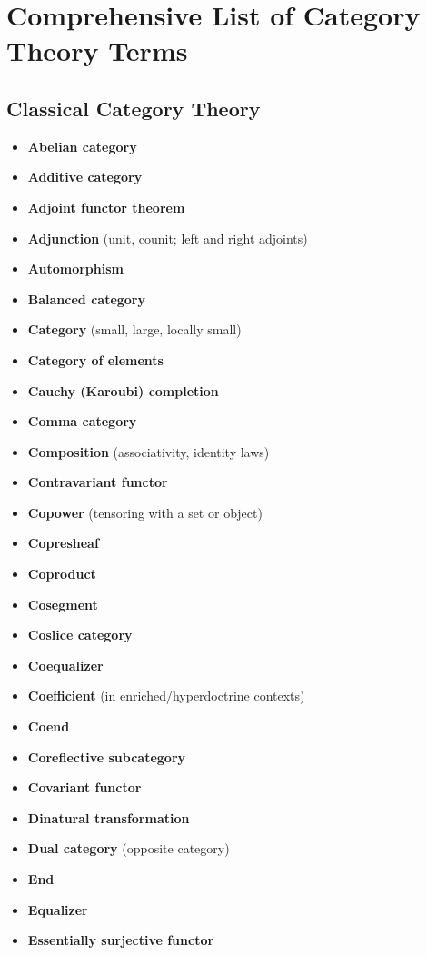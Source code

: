 \section{Comprehensive List of Category Theory Terms}

\subsection{Classical Category Theory}

\begin{itemize}
\item \textbf{Abelian category}
\item \textbf{Additive category}
\item \textbf{Adjoint functor theorem}
\item \textbf{Adjunction} (unit, counit; left and right adjoints)
\item \textbf{Automorphism}
\item \textbf{Balanced category}
\item \textbf{Category} (small, large, locally small)
\item \textbf{Category of elements}
\item \textbf{Cauchy (Karoubi) completion}
\item \textbf{Comma category}
\item \textbf{Composition} (associativity, identity laws)
\item \textbf{Contravariant functor}
\item \textbf{Copower} (tensoring with a set or object)
\item \textbf{Copresheaf}
\item \textbf{Coproduct}
\item \textbf{Cosegment}
\item \textbf{Coslice category}
\item \textbf{Coequalizer}
\item \textbf{Coefficient} (in enriched/hyperdoctrine contexts)
\item \textbf{Coend}
\item \textbf{Coreflective subcategory}
\item \textbf{Covariant functor}
\item \textbf{Dinatural transformation}
\item \textbf{Dual category} (opposite category)
\item \textbf{End}
\item \textbf{Equalizer}
\item \textbf{Essentially surjective functor}

\end{itemize}
